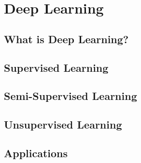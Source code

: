 
\chapter{Deep Learning\authorB}

\section{What is Deep Learning?}
\section{Supervised Learning}
\section{Semi-Supervised Learning}
\section{Unsupervised Learning}
\section{Applications}

